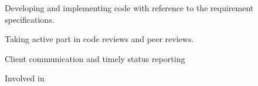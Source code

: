 \documentclass[a4,10pt]{cv4tw}
\begin{document}
    \vspace{-0.4cm}
    {
        \vspace{-0.4cm}
        \begin{missions}
        \item Developing and implementing code  with reference to the requirement specifications.
        \item Taking active part in code reviews and peer reviews.
        \item Client communication  and timely status reporting
        \item Involved in
        \end{missions}
    }
\end{document}
